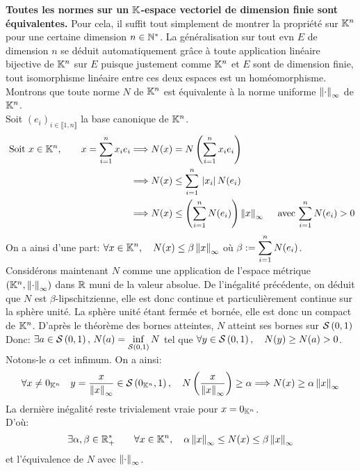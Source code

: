 \documentclass[12pt,a4paper]{article}
\begin{document}
	\textbf{Toutes les normes sur un $\ens{K}$-espace vectoriel de dimension finie sont équivalentes.} Pour cela, il suffit tout simplement de montrer la propriété sur $\ens{K}^n$ pour une certaine dimension $n\in \ens{N}^*$. La généralisation sur tout evn $E$ de dimension $n$ se déduit automatiquement grâce à toute application linéaire bijective de $\ens{K}^n$ sur $E$ puisque justement comme $\ens{K}^n$ et $E$ sont de dimension finie, tout isomorphisme linéaire entre ces deux espaces est un homéomorphisme. \\
	Montrons que toute norme $N$ de $\ens{K}^n$ est équivalente à la norme uniforme $\norm{\cdot}_{\infty}$ de $\ens{K}^n$.\\
	Soit $(e_i)_{i\in \llbracket 1,n \rrbracket}$ la base canonique de $\ens{K}^n$.
	\begin{align*}
		\text{ Soit } x\in \ens{K}^n, \qquad x=\somme{i=1}{n} x_i e_i &\Longrightarrow N(x) =N\left(\somme{i=1}{n} x_i e_i\right) \\
		&\Longrightarrow N(x) \leq \somme{i=1}{n} \abs{x_i} N(e_i)\\
		&\Longrightarrow N(x) \leq \left(\somme{i=1}{n} N(e_i)\right) \norm{x}_{\infty} \quad\text{ avec } \somme{i=1}{n} N(e_i)>0
	\end{align*}
	On a ainsi d'une part: $\grandm \forall x\in \ens{K}^n, \quad N(x)\leq \beta \norm{x}_\infty$ où $\grandm \beta:=\somme{i=1}{n} N(e_i)$.\\
	Considérons maintenant $N$ comme une application de l'espace métrique $(\ens{K}^n,\norm{\cdot}_{\infty})$ dans $\ens{R}$ muni de la valeur absolue. De l'inégalité précédente, on déduit que $N$ est $\beta$-lipschitzienne, elle est donc continue et particulièrement continue sur la sphère unité. La sphère unité étant fermée et bornée, elle est donc un compact de $\ens{K}^n$. D'après le théorème des bornes atteintes, $N$ atteint ses bornes sur $\sphere{0}{1}$ Donc: $\exists a\in \sphere{0}{1},\, N(a)=\inf\limits_{\sphere{0}{1}} N$ tel que $ \forall y\in \sphere{0}{1}, \quad N(y)\geq N(a)>0 $. Notons-le $\alpha$ cet infimum.  On a ainsi: $$\grandm\forall x\neq 0_{\ens{K}^n} \quad y=\frac{x}{\norm{x}_{\infty}} \in \sphere{0_{\ens{K}^n}}{1},\quad N\left(\dfrac{x}{\norm{x}_{\infty}}\right)\geq \alpha \Longrightarrow N(x)\geq \alpha \norm{x}_{\infty}$$ 
	La dernière inégalité reste trivialement vraie pour $x=0_{\ens{K}^n}$.\\
	D'où: 
	\[ \exists \alpha,\beta\in\ens{R}^*_+\qquad \forall x\in \ens{K}^n ,\quad  \alpha\norm{x}_{\infty}\leq N(x) \leq\beta \norm{x}_{\infty} \] 
	et l'équivalence de $N$ avec $\norm{\cdot}_{\infty}$.\\
	
\end{document}
